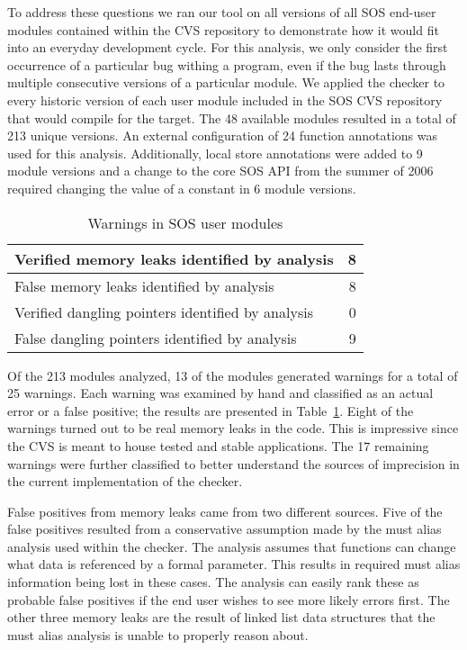 To address these questions we ran our tool on all versions of all SOS
end-user modules contained within the CVS repository to demonstrate
how it would fit into an everyday development cycle.  For this
analysis, we only consider the first occurrence of a particular bug
withing a program, even if the bug lasts through multiple consecutive
versions of a particular module.  We applied the checker to every
historic version of each user module included in the SOS CVS
repository that would compile for the  target.  The 48
available modules resulted in a total of 213 unique versions.
%
An external configuration of 24 function annotations was used for this
analysis.  
%
Additionally, local store annotations were added to 9 module versions
and a change to the core SOS API from the summer of 2006 required
changing the value of a constant in 6 module versions.


\begin{table}
\caption{Warnings in SOS user modules}
%
\label{tab:module}
\centering 
\begin{tabular}{| l | r |}
    \hline 
    Verified memory leaks identified by analysis & 8 \\
    \hline
    False memory leaks identified by analysis & 8 \\
    \hline 
    Verified dangling pointers identified by analysis & 0 \\
    \hline 
    False dangling pointers identified by analysis & 9 \\
    \hline 
\end{tabular} 
%
\end{table}

Of the 213 modules analyzed, 13 of the modules generated warnings for a
total of 25 warnings.
%
Each warning was examined by hand and classified as an actual error or
a false positive; the results are presented in Table~\ref{tab:module}.  
%
Eight of the warnings turned out to be real memory leaks in the code.
This is impressive since the CVS is meant to house tested and stable
applications.
%
The 17 remaining warnings were further classified to better understand
the sources of imprecision in the current implementation of the
checker.  

\smallskip{}

False positives from memory leaks came from two different sources.
Five of the false positives resulted from a conservative assumption
made by the must alias analysis used within the checker.  The analysis
assumes that functions can change what data is referenced by a formal
parameter.  This results in required must alias information being lost
in these cases.  The analysis can easily rank these as probable false
positives if the end user wishes to see more likely errors first.  The
other three memory leaks are the result of linked list data structures
that the must alias analysis is unable to properly reason about.  


